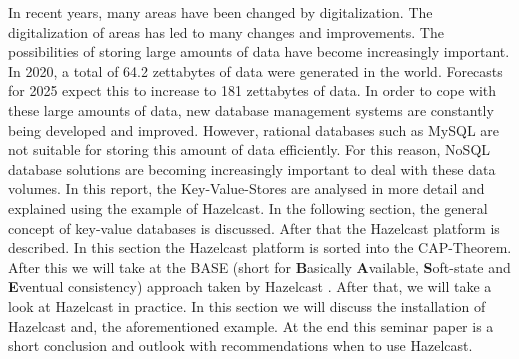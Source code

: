 
In recent years, many areas have been changed by digitalization.
The digitalization of areas has led to many changes and improvements. The
possibilities of storing large amounts of data have become increasingly
important. In 2020, a total of 64.2 zettabytes of data were generated in the
world. Forecasts for 2025 expect this to increase to 181 zettabytes of data. In
order to cope with these large amounts of data, new database management systems
are constantly being developed and improved. However, rational databases such as
MySQL are not suitable for storing this amount of data efficiently. For this
reason, NoSQL database solutions are becoming increasingly important to deal
with these data volumes. In this report, the Key-Value-Stores are analysed in
more detail and explained using the example of Hazelcast. In the following
section, the general concept of key-value databases is discussed.
\parencite{data_development_2012_2025, Key_Value_Datastore} After that the
Hazelcast platform is described. In this section the Hazelcast platform is sorted into
the CAP-Theorem. After this we will take at the BASE (short for
\textbf{B}asically \textbf{A}vailable, \textbf{S}oft-state and \textbf{E}ventual
consistency) \parencite{Brewer2000} approach taken by Hazelcast
\parencite{HZfailure}. After that, we will take a look at Hazelcast in practice.
In this section we will discuss the installation of Hazelcast and, the
aforementioned example. At the end this seminar paper is a short conclusion and
outlook with recommendations when to use Hazelcast.